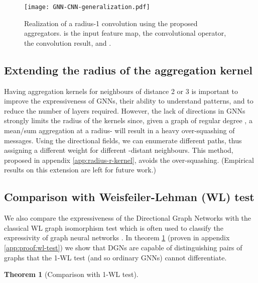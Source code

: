 \documentclass{article} \usepackage{arxiv,times}
\newtheorem{theorem}{Theorem}[section]
\begin{document}
\begin{figure}[h]
    \centering
    \texttt{[image: GNN-CNN-generalization.pdf]}
    \vspace{-10pt}
    \caption{Realization of a radius-1 convolution using the proposed aggregators.  is the input feature map,  the convolutional operator,  the convolution result, and .}
    \label{fig:cnn-gnn-generalization}
\end{figure}

\subsection{Extending the radius of the aggregation kernel}

Having aggregation kernels for neighbours of distance 2 or 3 is important to improve the expressiveness of GNNs, their ability to understand patterns, and to reduce the number of layers required. However, the lack of directions in GNNs strongly limits the radius of the kernels since, given a graph of regular degree , a mean/sum aggregation at a radius- will result in a heavy over-squashing of  messages. Using the directional fields, we can enumerate different paths, thus assigning a different weight for different -distant neighbours. This method, proposed in appendix \ref{app:radius-r-kernel}, avoids the over-squashing. (Empirical results on this extension are left for future work.)

\subsection{Comparison with Weisfeiler-Lehman (WL) test}

We also compare the expressiveness of the Directional Graph Networks with the classical WL graph isomorphism test which is often used to classify the expressivity of graph neural networks \cite{xu2018gin}. In theorem \ref{th:wl-test} (proven in appendix \ref{app:proof:wl-test}) we show that DGNs are capable of distinguishing pairs of graphs that the 1-WL test (and so ordinary GNNs) cannot differentiate.

\begin{theorem}[Comparison with 1-WL test]
\label{th:wl-test}
\end{theorem}
\end{document}
